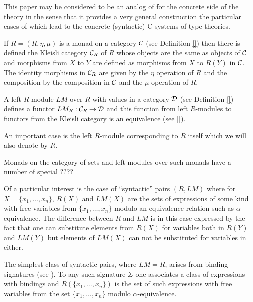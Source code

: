 \documentclass[11pt]{article}
\newcommand{\sr}{\rightarrow}
\begin{document}
This paper may be considered to be an analog of \cite{Cfromauniverse} for the concrete side of the theory in the sense that it provides a very general construction the particular cases of which lead to the concrete (syntactic) C-systems of type theories. 

If $R=(R,\eta,\mu)$ is a monad on a category $\cal C$ (see Definition \ref{}) then there is defined the Kleisli category ${\cal C}_R$ of $R$ whose objects are the same as objects of $\cal C$ and morphisms from $X$ to $Y$ are defined as morphisms from $X$ to $R(Y)$ in $\cal C$. The identity morphisms in ${\cal C}_R$ are given by the $\eta$ operation of $R$ and the composition by the composition in $\cal C$ and the $\mu$ operation of $R$.

A left $R$-module $LM$  over $R$ with values in a category $\cal D$ (see Definition \ref{}) defines a functor $LM_R:{\cal C}_R\sr {\cal D}$ and this function from left $R$-modules to functors from the Kleisli category is an equivalence (see \ref{}). 

An important case is the left $R$-module corresponding to $R$ itself which we will also denote by $R$.   

Monads on the category of sets and left modules over such monads have a number of special ????


Of a particular interest is the case of ``syntactic'' pairs $(R,LM)$ where for $X=\{x_1,\dots,x_n\}$, $R(X)$ and $LM(X)$ are the sets of expressions of some kind with free variables from $\{x_1,\dots,x_n\}$ modulo an equivalence relation such as $\alpha$-equivalence. The difference between $R$ and $LM$ is in this case expressed by the fact that one can substitute elements from $R(X)$ for variables both in $R(Y)$ and $LM(Y)$ but elements of $LM(X)$ can not be substituted for variables in either. 

The simplest class of syntactic pairs, where $LM=R$, arises from binding signatures (see \cite[p.228]{HM2007}). To any such signature $\Sigma$ one associates a class of expressions with bindings and $R(\{x_1,\dots,x_n\})$ is the set of such expressions with free variables from the set $\{x_1,\dots,x_n\}$ modulo $\alpha$-equivalence.  
\end{document}
